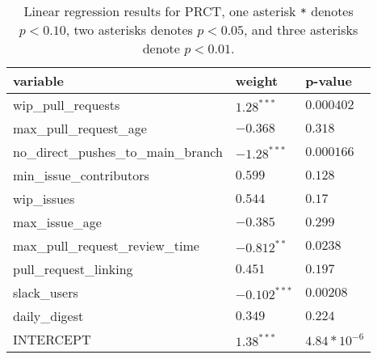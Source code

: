 \renewcommand{\arraystretch}{1.2}
\begin{table}
\begin{center}
\begin{tabular}{|p{6cm}|p{3cm}|p{3cm}|} 
\hline
variable & weight & p-value \\ [0.5ex]
\hline\hline

wip\_pull\_requests & $1.28^{***}$ & $0.000402$ \\
max\_pull\_request\_age & $-0.368$ & $0.318$ \\
no\_direct\_pushes\_to\_main\_branch & $-1.28^{***}$ & $0.000166$ \\
min\_issue\_contributors & $0.599$ & $0.128$ \\
wip\_issues & $0.544$ & $0.17$ \\
max\_issue\_age & $-0.385$ & $0.299$ \\
max\_pull\_request\_review\_time & $-0.812^{**}$ & $0.0238$ \\
pull\_request\_linking & $0.451$ & $0.197$ \\
slack\_users & $-0.102^{***}$ & $0.00208$ \\
daily\_digest & $0.349$ & $0.224$ \\

\hline\hline
INTERCEPT & $1.38^{***}$ & $4.84*10^{-6}$ \\ 

\hline
\end{tabular}
\caption{Linear regression results for PRCT, one asterisk \texttt{*} denotes  $p < 0.10$, two asterisks denotes $p < 0.05$, and three asterisks denote $p < 0.01$.}
\label{tab:lmResults}
\end{center}
\end{table}